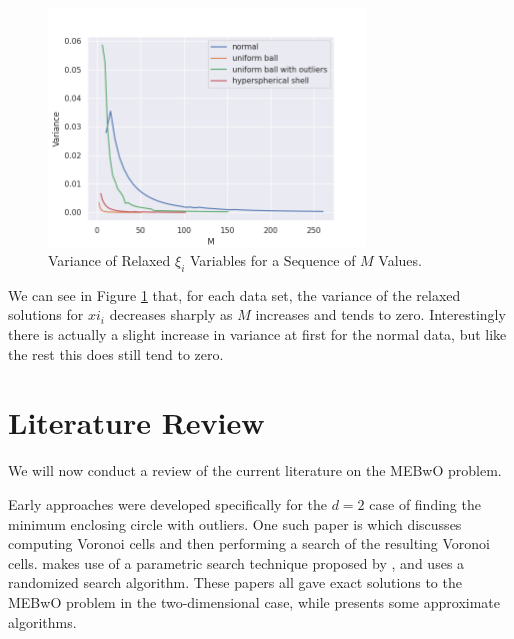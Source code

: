 \documentclass[11pt,twoside]{report}
\theoremstyle{definition}
\numberwithin{theorem}{section}
\numberwithin{definition}{section}
\numberwithin{lemma}{section}
\numberwithin{proposition}{section}
\numberwithin{equation}{section}
\numberwithin{figure}{section}
\begin{document}
\begin{figure}
    \centering
    \includegraphics[width=0.75\textwidth]{xi_analysis.png}
    \caption{Variance of Relaxed $\xi_i$ Variables for a Sequence of $M$ Values.}
    \label{fig:xi analysis}
\end{figure}

We can see in Figure \ref{fig:xi analysis} that, for each data set, the variance of the relaxed solutions for $xi_i$ decreases sharply as $M$ increases and tends to zero. Interestingly there is actually a slight increase in variance at first for the normal data, but like the rest this does still tend to zero.

\section{Literature Review}\label{lit review}
We will now conduct a review of the current literature on the MEBwO problem.

Early approaches were developed specifically for the $d=2$ case of finding the minimum enclosing circle with outliers. One such paper is \cite{AGGARWAL199138} which discusses computing Voronoi cells and then performing a search of the resulting Voronoi cells. \cite{efrat} makes use of a parametric search technique proposed by \cite{megiddo}, and \cite{MATOUSEK1995217} uses a randomized search algorithm. These papers all gave exact solutions to the MEBwO problem in the two-dimensional case, while \cite{harpeled} presents some approximate algorithms.
\end{document}
